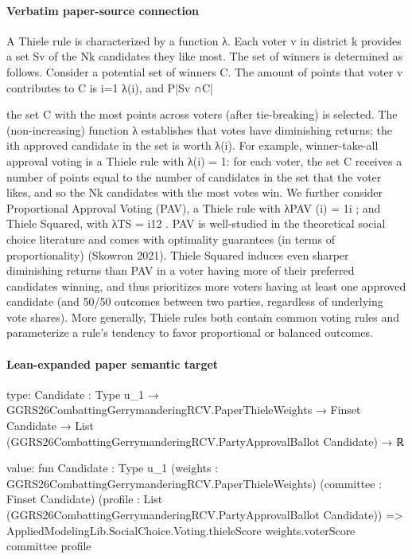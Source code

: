 \documentclass[10pt]{article}
\begin{document}
\paragraph{Verbatim paper-source connection}
\begin{ReviewVerbatim}
A Thiele rule is characterized by a function λ. Each voter v in district k provides a set Sv
of the Nk candidates they like most. The set of winners is determined as follows. Consider a
potential set of winners C. The amount of points that voter v contributes to C is i=1         λ(i), and
                                                                                     P|Sv ∩C|

the set C with the most points across voters (after tie-breaking) is selected. The (non-increasing)
function λ establishes that votes have diminishing returns; the ith approved candidate in the set is
worth λ(i). For example, winner-take-all approval voting is a Thiele rule with λ(i) = 1: for each
voter, the set C receives a number of points equal to the number of candidates in the set that the
voter likes, and so the Nk candidates with the most votes win. We further consider Proportional
Approval Voting (PAV), a Thiele rule with λPAV (i) = 1i ; and Thiele Squared, with λTS = i12 . PAV
is well-studied in the theoretical social choice literature and comes with optimality guarantees (in
terms of proportionality) (Skowron 2021). Thiele Squared induces even sharper diminishing returns
than PAV in a voter having more of their preferred candidates winning, and thus prioritizes more
voters having at least one approved candidate (and 50/50 outcomes between two parties, regardless
of underlying vote shares). More generally, Thiele rules both contain common voting rules and
parameterize a rule’s tendency to favor proportional or balanced outcomes.
\end{ReviewVerbatim}



\paragraph{Lean-expanded paper semantic target}
\begin{ReviewVerbatim}
type:
{Candidate : Type u_1} →
  GGRS26CombattingGerrymanderingRCV.PaperThieleWeights →
    Finset Candidate → List (GGRS26CombattingGerrymanderingRCV.PartyApprovalBallot Candidate) → ℝ

value:
fun {Candidate : Type u_1} (weights : GGRS26CombattingGerrymanderingRCV.PaperThieleWeights)
    (committee : Finset Candidate) (profile : List (GGRS26CombattingGerrymanderingRCV.PartyApprovalBallot Candidate)) =>
  AppliedModelingLib.SocialChoice.Voting.thieleScore weights.voterScore committee profile
\end{ReviewVerbatim}
\end{document}
